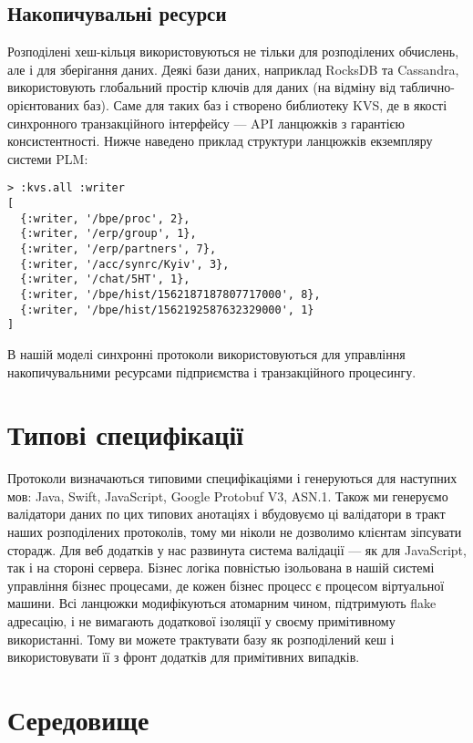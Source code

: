 \newpage
\subsection{Накопичувальні ресурси}

Розподілені хеш-кільця використовуються не тільки для розподілених обчислень,
але і для зберігання даних.
Деякі бази даних, наприклад RocksDB та Cassandra, використовують глобальний простір
ключів для даних (на відміну від таблично-орієнтованих баз). Саме для таких
баз і створено библиотеку KVS, де в якості синхронного транзакційного
інтерфейсу — API ланцюжків з гарантією консистентності. Нижче
наведено приклад структури ланцюжків екземпляру системи PLM:

   \begin{lstlisting}
> :kvs.all :writer
[
  {:writer, '/bpe/proc', 2},
  {:writer, '/erp/group', 1},
  {:writer, '/erp/partners', 7},
  {:writer, '/acc/synrc/Kyiv', 3},
  {:writer, '/chat/5HT', 1},
  {:writer, '/bpe/hist/1562187187807717000', 8},
  {:writer, '/bpe/hist/1562192587632329000', 1}
]
\end{lstlisting}

В нашій моделі синхронні протоколи використовуються для управління
накопичувальними ресурсами підприємства і транзакційного процесингу.

\section{Типові специфікації}

Протоколи визначаються типовими специфікаціями і генеруються для наступних мов:
Java, Swift, JavaScript, Google Protobuf V3, ASN.1. Також ми генеруємо валідатори даних по цих
типових анотаціях і вбудовуємо ці валідатори в тракт наших розподілених протоколів,
тому ми ніколи не дозволимо клієнтам зіпсувати сторадж. Для веб додатків у нас развинута
система валідації — як для JavaScript, так і на стороні сервера. Бізнес логіка повністью ізольована в нашій
системі управління бізнес процесами, де кожен бізнес процесс
є процесом віртуальної машини. Всі ланцюжки модифікуються атомарним чином,
підтримують flake адресацію, і не вимагають додаткової ізоляції
у своєму примітивному використанні.
Тому ви можете трактувати базу як розподілений кеш
і використовувати її з фронт додатків для примітивних випадків.

\newpage
\section{Середовище}

